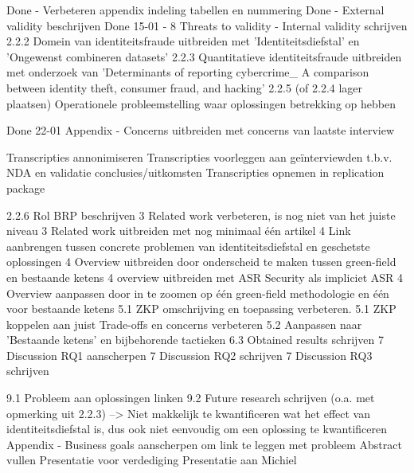 Done - Verbeteren appendix indeling tabellen en nummering
Done - External validity beschrijven
Done 15-01 - 
8 Threats to validity - Internal validity schrijven
2.2.2 Domein van identiteitsfraude uitbreiden met 'Identiteitsdiefstal' en 'Ongewenst combineren datasets'
2.2.3 Quantitatieve identiteitsfraude uitbreiden met onderzoek van 'Determinants of reporting cybercrime_ A
comparison between identity theft, consumer fraud, and hacking'
2.2.5 (of 2.2.4 lager plaatsen) Operationele probleemstelling waar oplossingen betrekking op hebben

Done 22-01
Appendix - Concerns uitbreiden met concerns van laatste interview

\todo
Transcripties annonimiseren
Transcripties voorleggen aan geïnterviewden t.b.v. NDA en validatie conclusies/uitkomsten
Transcripties opnemen in replication package

2.2.6 Rol BRP beschrijven
3 Related work verbeteren, is nog niet van het juiste niveau
3 Related work uitbreiden met nog minimaal één artikel
4 Link aanbrengen tussen concrete problemen van identiteitsdiefstal en geschetste oplossingen
4 Overview uitbreiden door onderscheid te maken tussen green-field en bestaande ketens
4 overview uitbreiden met ASR Security als impliciet ASR
4 Overview aanpassen door in te zoomen op één green-field methodologie en één voor bestaande ketens
5.1 ZKP omschrijving en toepassing verbeteren.
5.1 ZKP koppelen aan juist Trade-offs en concerns verbeteren
5.2 Aanpassen naar 'Bestaande ketens' en bijbehorende tactieken
6.3 Obtained results schrijven
7 Discussion RQ1 aanscherpen
7 Discussion RQ2 schrijven
7 Discussion RQ3 schrijven

9.1 Probleem aan oplossingen linken
9.2 Future research schrijven (o.a. met opmerking uit 2.2.3) --> Niet makkelijk te kwantificeren wat het effect van identiteitsdiefstal is, dus ook niet eenvoudig om een oplossing te kwantificeren
Appendix - Business goals aanscherpen om link te leggen met probleem
Abstract vullen
Presentatie voor verdediging
Presentatie aan Michiel